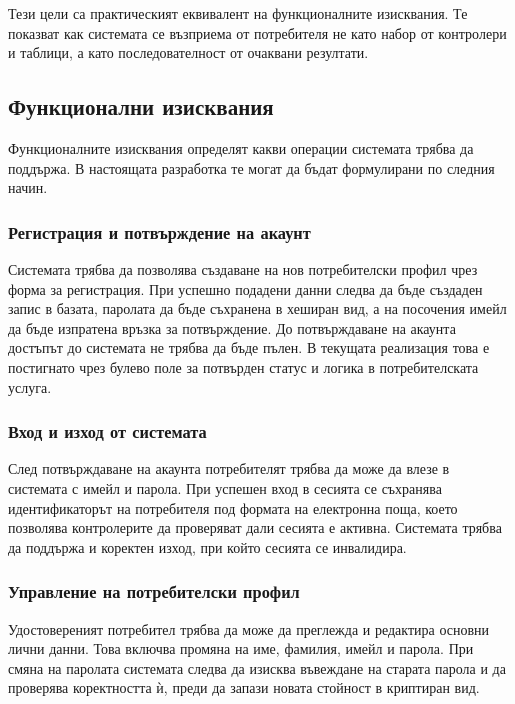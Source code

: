 Тези цели са практическият еквивалент на функционалните изисквания. Те показват как системата се възприема от потребителя не като набор от контролери и таблици, а като последователност от очаквани резултати.

\subsection{Функционални изисквания}

Функционалните изисквания определят какви операции системата трябва да поддържа. В настоящата разработка те могат да бъдат формулирани по следния начин.

\subsubsection{Регистрация и потвърждение на акаунт}

Системата трябва да позволява създаване на нов потребителски профил чрез форма за регистрация. При успешно подадени данни следва да бъде създаден запис в базата, паролата да бъде съхранена в хеширан вид, а на посочения имейл да бъде изпратена връзка за потвърждение. До потвърждаване на акаунта достъпът до системата не трябва да бъде пълен. В текущата реализация това е постигнато чрез булево поле за потвърден статус и логика в потребителската услуга.

\subsubsection{Вход и изход от системата}

След потвърждаване на акаунта потребителят трябва да може да влезе в системата с имейл и парола. При успешен вход в сесията се съхранява идентификаторът на потребителя под формата на електронна поща, което позволява контролерите да проверяват дали сесията е активна. Системата трябва да поддържа и коректен изход, при който сесията се инвалидира.

\subsubsection{Управление на потребителски профил}

Удостовереният потребител трябва да може да преглежда и редактира основни лични данни. Това включва промяна на име, фамилия, имейл и парола. При смяна на паролата системата следва да изисква въвеждане на старата парола и да проверява коректността ѝ, преди да запази новата стойност в криптиран вид.

